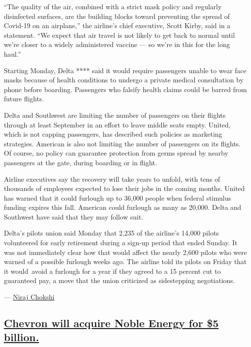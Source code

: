 ``The quality of the air, combined with a strict mask policy and
regularly disinfected surfaces, are the building blocks toward
preventing the spread of Covid-19 on an airplane,'' the airline's chief
executive, Scott Kirby, said in a statement. ``We expect that air travel
is not likely to get back to normal until we're closer to a widely
administered vaccine --- so we're in this for the long haul.''

Starting Monday, Delta **** said it would require passengers unable to
wear face masks because of health conditions to undergo a private
medical consultation by phone before boarding. Passengers who falsify
health claims could be barred from future flights.

Delta and Southwest are limiting the number of passengers on their
flights through at least September in an effort to leave middle seats
empty. United, which is not capping passengers, has described such
policies as marketing strategies. American is also not limiting the
number of passengers on its flights. Of course, no policy can guarantee
protection from germs spread by nearby passengers at the gate, during
boarding or in flight.

Airline executives say the recovery will take years to unfold, with tens
of thousands of employees expected to lose their jobs in the coming
months. United has warned that it could furlough up to 36,000 people
when federal stimulus funding expires this fall. American could furlough
as many as 20,000. Delta and Southwest have said that they may follow
suit.

Delta's pilots union said Monday that 2,235 of the airline's 14,000
pilots volunteered for early retirement during a sign-up period that
ended Sunday. It was not immediately clear how that would affect the
nearly 2,600 pilots who were warned of a possible furlough weeks ago.
The airline told its pilots on Friday that it would~avoid a furlough for
a year if they agreed to a 15 percent cut to guaranteed pay, a move that
the union criticized as sidestepping negotiations.

--- \href{https://www.nytimes.com/by/niraj-chokshi}{Niraj Chokshi}

\hypertarget{chevron-will-acquire-noble-energy-for-5-billion}{%
\subsection{\texorpdfstring{\protect\hyperlink{chevron-will-acquire-noble-energy-for-5-billion}{Chevron
will acquire Noble Energy for \$5
billion.}}{Chevron will acquire Noble Energy for \$5 billion.}}\label{chevron-will-acquire-noble-energy-for-5-billion}}

